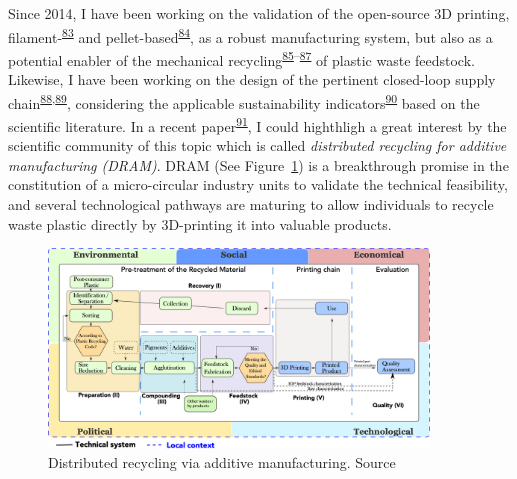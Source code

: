 \documentclass[
  12pt,
  a4paperpaper,
  onecolumn]{article}
\begin{document}
Since 2014, I have been working on the validation of the open-source 3D
printing,
filament-\textsuperscript{\protect\hyperlink{ref-CruzSanchez2014}{83}}
and
pellet-based\textsuperscript{\protect\hyperlink{ref-Arthur2020}{84}}, as
a robust manufacturing system, but also as a potential enabler of the
mechanical
recycling\textsuperscript{\protect\hyperlink{ref-Cruz2015}{85}--\protect\hyperlink{ref-lopez2022}{87}}
of plastic waste feedstock. Likewise, I have been working on the design
of the pertinent closed-loop supply
chain\textsuperscript{\protect\hyperlink{ref-Pavlo2018}{88},\protect\hyperlink{ref-Santander2020}{89}},
considering the applicable sustainability
indicators\textsuperscript{\protect\hyperlink{ref-Santander2022}{90}}
based on the scientific literature. In a recent
paper\textsuperscript{\protect\hyperlink{ref-CruzSanchez2020}{91}}, I
could highthligh a great interest by the scientific community of this
topic which is called \emph{distributed recycling for additive
manufacturing (DRAM)}. DRAM (See Figure~\ref{fig-DRAM}) is a
breakthrough promise in the constitution of a micro-circular industry
units to validate the technical feasibility, and several technological
pathways are maturing to allow individuals to recycle waste plastic
directly by 3D-printing it into valuable products.

\begin{figure}

{\centering \includegraphics[width=0.9\textwidth,height=\textheight]{Figures/SDRAM-00.png}

}

\caption{\label{fig-DRAM}Distributed recycling via additive
manufacturing. Source}

\end{figure}
\end{document}
